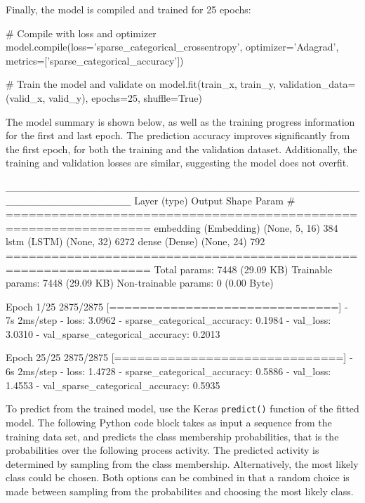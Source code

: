 Finally, the model is compiled and trained for 25 epochs:

\begin{samepage}
\begin{pythoncode}
# Compile with loss and optimizer
model.compile(loss='sparse_categorical_crossentropy',
              optimizer='Adagrad',
              metrics=['sparse_categorical_accuracy'])

# Train the model and validate on
model.fit(train_x, train_y,
          validation_data=(valid_x, valid_y),
          epochs=25, shuffle=True)
\end{pythoncode}
\end{samepage}

The model summary is shown below, as well as the training progress information for the first and last epoch. The prediction accuracy improves significantly from the first epoch, for both the training and the validation dataset. Additionally, the training and validation losses are similar, suggesting the model does not overfit.

\begin{samepage}
\begin{textcode}
_________________________________________________________________
 Layer (type)                Output Shape              Param #   
=================================================================
 embedding (Embedding)       (None, 5, 16)             384       
 lstm (LSTM)                 (None, 32)                6272      
 dense (Dense)               (None, 24)                792       
=================================================================
Total params: 7448 (29.09 KB)
Trainable params: 7448 (29.09 KB)
Non-trainable params: 0 (0.00 Byte)

Epoch 1/25
2875/2875 [==============================] - 7s 2ms/step - 
loss: 3.0962 - sparse_categorical_accuracy: 0.1984 - 
val_loss: 3.0310 - val_sparse_categorical_accuracy: 0.2013

Epoch 25/25
2875/2875 [==============================] - 6s 2ms/step - 
loss: 1.4728 - sparse_categorical_accuracy: 0.5886 - 
val_loss: 1.4553 - val_sparse_categorical_accuracy: 0.5935
\end{textcode}
\end{samepage}

To predict from the trained model, use the Keras \texttt{predict()} function of the fitted model. The following Python code block takes as input a sequence from the training data set, and predicts the class membership probabilities, that is the probabilities over the following process activity. The predicted activity is determined by sampling from the class membership. Alternatively, the most likely class could be chosen. Both options can be combined in that a random choice is made between sampling from the probabilites and choosing the most likely class. 

